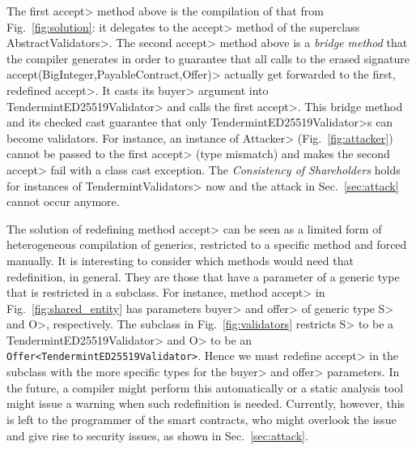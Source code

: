 \noindent
The first \<accept> method above is the compilation of that from Fig.~\ref{fig:solution}:
it delegates to the \<accept> method of the superclass \<AbstractValidators>. The second
\<accept> method above is a \emph{bridge method} that the compiler generates in order to guarantee
that all calls to the erased signature \<accept(BigInteger,PayableContract,Offer)> actually
get forwarded to the first, redefined \<accept>. It casts its \<buyer> argument
into \<TendermintED25519Validator> and calls the first \<accept>. This
bridge method and its checked cast guarantee that only \<TendermintED25519Validator>s
can become validators. For instance, an instance of \<Attacker> (Fig.~\ref{fig:attacker})
cannot be passed to the first \<accept> (type mismatch) and makes the second \<accept>
fail with a class cast exception. The \emph{Consistency of Shareholders} holds
for instances of \<TendermintValidators> now and the attack in Sec.~\ref{sec:attack} cannot occur
anymore.

The solution of redefining method \<accept> can be seen as a limited form of heterogeneous
compilation of generics, restricted to a specific method and forced manually.
It is interesting to consider which methods
would need that redefinition, in general. They are those that have a parameter of a generic type
that is restricted in a subclass. For instance, method \<accept> in
Fig.~\ref{fig:shared_entity} has parameters \<buyer> and \<offer> of generic type
\<S> and \<O>, respectively. The subclass in Fig.~\ref{fig:validators} restricts
\<S> to be a \<TendermintED25519Validator> and \<O> to be
an {\codesize\texttt{Offer<TendermintED25519Validator>}}. Hence we must redefine
\<accept> in the subclass with the more specific types for the \<buyer> and \<offer>
parameters. In the future, a compiler might perform this automatically or a static analysis
tool might issue a warning when such redefinition is needed. Currently, however, this is
left to the programmer of the smart contracts, who might overlook the issue
and give rise to security issues, as shown in Sec.~\ref{sec:attack}.

